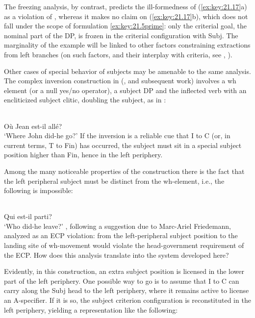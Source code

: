 \documentclass[output=paper]{langsci/langscibook}
\begin{document}
\begin{exe}
The freezing analysis, by contrast, predicts the ill-formedness of
(\ref{ex:key:21.17}a) as a violation of , whereas it
makes no claim on (\ref{ex:key:21.17}b), which does not fall under the scope of
formulation  \eqref{ex:key:21.5prime}: only the criterial goal, the nominal
part of the DP, is frozen in the criterial configuration with Subj\tss{[+N]}.
The marginality of the example will be linked to other factors constraining
extractions from left branches (on such factors, and their interplay with
criteria, see \citealt{Lohndal2010}, \citealt{Berthelot2017}).

Other cases of special behavior of subjects may be amenable to the same
analysis. The complex inversion construction in 
(\citealt{Kayne1972,RizziRoberts1989}, and subsequent work) involves a wh
element (or a null yes/no operator), a subject DP and the inflected verb with
an encliticized subject clitic, doubling the subject, as in :

\ea%
    \label{ex:key:21.18}\\
    Où        Jean est-il allé?\\
         ‘Where John did-he go?’
\z
%
If the inversion is a reliable cue that I to C (or, in current terms, T to Fin)
has occurred, the subject must sit in a special subject position higher than
Fin, hence in the left periphery.

Among the many noticeable properties of the construction there is the fact that
the left peripheral subject must be distinct from the wh-element, i.e., the
following is impossible:

\ea%
    \label{ex:key:21.19}\\
    \llap{*}Qui    est-il  parti?\\
        ‘Who did-he leave?’
\z
%
\textcite{RizziRoberts1989}, following a suggestion due to Marc-Ariel
Friedemann, analyzed  as an \gls{ECP} violation:  from the left-peripheral subject position to the
landing site of wh-movement would violate the head-government requirement of
the \gls{ECP}. How does this analysis translate into the system developed here?

Evidently, in this construction, an extra subject position is licensed in the
lower part of the left periphery. One possible way to go is to assume that I to
C can carry along the Subj head to the left periphery, where it remains active
to license an A-specifier. If it is so, the subject criterion configuration is
reconstituted in the left periphery, yielding a representation like the
following:


\end{exe}
\end{document}
